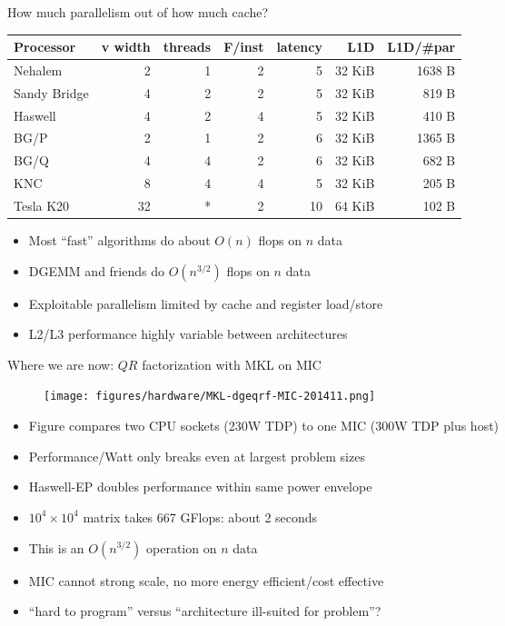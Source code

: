 \documentclass{beamer}
\begin{document}

\begin{frame}{How much parallelism out of how much cache?}
  \begin{tabular}{l rrrr rr}
    \toprule
    Processor & v width & threads & F/inst & latency & L1D & L1D/\#par \\
    \midrule
    Nehalem & 2 & 1 & 2 & 5 & 32 KiB & 1638 B \\
    Sandy Bridge & 4 & 2 & 2 & 5 & 32 KiB & 819 B \\
    Haswell & 4 & 2 & 4 & 5 & 32 KiB & 410 B \\
    BG/P & 2 & 1 & 2 & 6 & 32 KiB & 1365 B \\
    BG/Q & 4 & 4 & 2 & 6 & 32 KiB & 682 B \\
    KNC & 8 & 4 & 4 & 5 & 32 KiB & 205 B \\
    Tesla K20 & 32 & * & 2 & 10 & 64 KiB & 102 B \\
    \bottomrule
  \end{tabular}
  \begin{itemize}
  \item Most ``fast'' algorithms do about $O(n)$ flops on $n$ data
  \item DGEMM and friends do $O(n^{3/2})$ flops on $n$ data
  \item Exploitable parallelism limited by cache and register load/store
  \item L2/L3 performance highly variable between architectures
  \end{itemize}
\end{frame}

\begin{frame}{Where we are now: $QR$ factorization with MKL on MIC}
  \begin{figure}
    \centering
    \texttt{[image: figures/hardware/MKL-dgeqrf-MIC-201411.png]}
  \end{figure}
  \begin{itemize}
  \item Figure compares two CPU sockets (230W TDP) to one MIC (300W TDP plus host)
  \item Performance/Watt only breaks even at largest problem sizes
  \item Haswell-EP doubles performance within same power envelope
  \item $10^4 \times 10^4$ matrix takes 667 GFlops: about 2 seconds
  \item This is an $O(n^{3/2})$ operation on $n$ data
  \item MIC cannot strong scale, no more energy efficient/cost effective
  \item ``hard to program'' versus ``architecture ill-suited for problem''?
  \end{itemize}
\end{frame}
\end{document}
